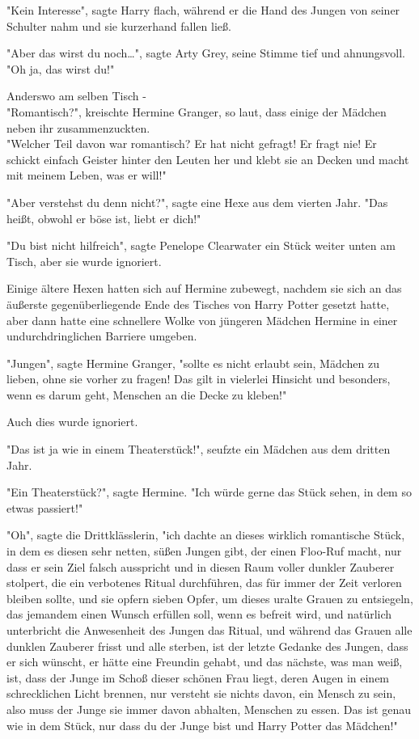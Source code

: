 {"Kein Interesse", sagte Harry flach, während er die Hand des Jungen von seiner Schulter nahm und sie kurzerhand fallen ließ.

"Aber das wirst du noch…", sagte Arty Grey, seine Stimme tief und ahnungsvoll. "Oh ja, das wirst du!"

Anderswo am selben Tisch -\\ "Romantisch?", kreischte Hermine Granger, so laut, dass einige der Mädchen neben ihr zusammenzuckten.\\ "Welcher Teil davon war romantisch? Er hat nicht gefragt! Er fragt nie! Er schickt einfach Geister hinter den Leuten her und klebt sie an Decken und macht mit meinem Leben, was er will!"

"Aber verstehst du denn nicht?", sagte eine Hexe aus dem vierten Jahr. "Das heißt, obwohl er böse ist, liebt er dich!"

"Du bist nicht hilfreich", sagte Penelope Clearwater ein Stück weiter unten am Tisch, aber sie wurde ignoriert.

Einige ältere Hexen hatten sich auf Hermine zubewegt, nachdem sie sich an das äußerste gegenüberliegende Ende des Tisches von Harry Potter gesetzt hatte, aber dann hatte eine schnellere Wolke von jüngeren Mädchen Hermine in einer undurchdringlichen Barriere umgeben.

"Jungen", sagte Hermine Granger, "sollte es nicht erlaubt sein, Mädchen zu lieben, ohne sie vorher zu fragen! Das gilt in vielerlei Hinsicht und besonders, wenn es darum geht, Menschen an die Decke zu kleben!"

Auch dies wurde ignoriert.

"Das ist ja wie in einem Theaterstück!", seufzte ein Mädchen aus dem dritten Jahr.

"Ein Theaterstück?", sagte Hermine. "Ich würde gerne das Stück sehen, in dem so etwas passiert!"

"Oh", sagte die Drittklässlerin, "ich dachte an dieses wirklich romantische Stück, in dem es diesen sehr netten, süßen Jungen gibt, der einen Floo-Ruf macht, nur dass er sein Ziel falsch ausspricht und in diesen Raum voller dunkler Zauberer stolpert, die ein verbotenes Ritual durchführen, das für immer der Zeit verloren bleiben sollte, und sie opfern sieben Opfer, um dieses uralte Grauen zu entsiegeln, das jemandem einen Wunsch erfüllen soll, wenn es befreit wird, und natürlich unterbricht die Anwesenheit des Jungen das Ritual, und während das Grauen alle dunklen Zauberer frisst und alle sterben, ist der letzte Gedanke des Jungen, dass er sich wünscht, er hätte eine Freundin gehabt, und das nächste, was man weiß, ist, dass der Junge im Schoß dieser schönen Frau liegt, deren Augen in einem schrecklichen Licht brennen, nur versteht sie nichts davon, ein Mensch zu sein, also muss der Junge sie immer davon abhalten, Menschen zu essen. Das ist genau wie in dem Stück, nur dass du der Junge bist und Harry Potter das Mädchen!"

}
